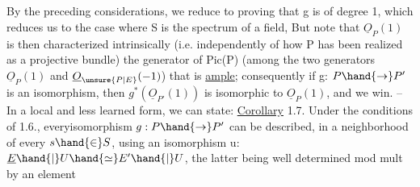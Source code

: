 By the preceding considerations, we reduce to proving
that g is of degree 1, which reduces us to the case where S is the spectrum of a
field, But note that $\underline{O}_P(1)$ is then characterized intrinsically (i.e.
independently of how P has been realized as a projective bundle)
 the generator of Pic(P) (among the two generators $\underline{O}_P(1)$ and
$\underline{O}_{\unsure{P|E}}(-1)$) that is \uline{ample}; consequently if g: $P\hand{\to} P'$ is an isomorphism,
then $g^{*}(\underline{O}_{P'}(1))$ is isomorphic to $\underline{O}_P(1)$, and we win. -- In a local
and less learned form, we can state:
\uline{Corollary} 1.7. Under the conditions of 1.6., everyisomorphism $g:P\hand{\to} P'$
can be described, in a neighborhood of every $s\hand{\in} S$, using an isomorphism
u: $\underline{E}\hand{|}U \hand{\simeq} E'\hand{|}U$, the latter being well determined mod mult by an element
